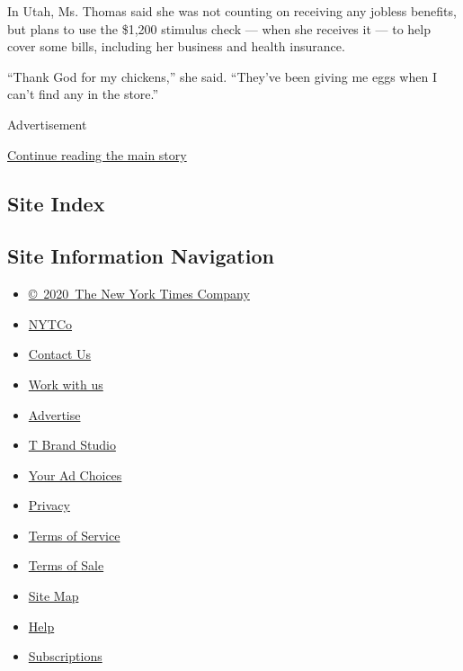 In Utah, Ms. Thomas said she was not counting on receiving any jobless
benefits, but plans to use the \$1,200 stimulus check --- when she
receives it --- to help cover some bills, including her business and
health insurance.

``Thank God for my chickens,'' she said. ``They've been giving me eggs
when I can't find any in the store.''

Advertisement

\protect\hyperlink{after-bottom}{Continue reading the main story}

\hypertarget{site-index}{%
\subsection{Site Index}\label{site-index}}

\hypertarget{site-information-navigation}{%
\subsection{Site Information
Navigation}\label{site-information-navigation}}

\begin{itemize}
\tightlist
\item
  \href{https://help.nytimes3xbfgragh.onion/hc/en-us/articles/115014792127-Copyright-notice}{©~2020~The
  New York Times Company}
\end{itemize}

\begin{itemize}
\tightlist
\item
  \href{https://www.nytco.com/}{NYTCo}
\item
  \href{https://help.nytimes3xbfgragh.onion/hc/en-us/articles/115015385887-Contact-Us}{Contact
  Us}
\item
  \href{https://www.nytco.com/careers/}{Work with us}
\item
  \href{https://nytmediakit.com/}{Advertise}
\item
  \href{http://www.tbrandstudio.com/}{T Brand Studio}
\item
  \href{https://www.nytimes3xbfgragh.onion/privacy/cookie-policy\#how-do-i-manage-trackers}{Your
  Ad Choices}
\item
  \href{https://www.nytimes3xbfgragh.onion/privacy}{Privacy}
\item
  \href{https://help.nytimes3xbfgragh.onion/hc/en-us/articles/115014893428-Terms-of-service}{Terms
  of Service}
\item
  \href{https://help.nytimes3xbfgragh.onion/hc/en-us/articles/115014893968-Terms-of-sale}{Terms
  of Sale}
\item
  \href{https://spiderbites.nytimes3xbfgragh.onion}{Site Map}
\item
  \href{https://help.nytimes3xbfgragh.onion/hc/en-us}{Help}
\item
  \href{https://www.nytimes3xbfgragh.onion/subscription?campaignId=37WXW}{Subscriptions}
\end{itemize}
